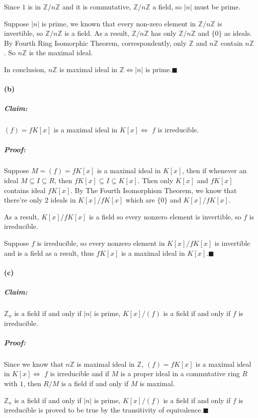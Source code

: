 \documentclass[11pt]{article}
\begin{document}
		Since $1$ is in $\mathbb{Z}/n\mathbb{Z}$ and it is commutative, $\mathbb{Z}/n\mathbb{Z}$ a field, so $|n|$ must be prime.
		
		Suppose $|n|$ is prime, we known that every non-zero element in $\mathbb{Z}/n\mathbb{Z}$ is invertible, so $\mathbb{Z}/n\mathbb{Z}$ is a field. As a result, $\mathbb{Z}/n\mathbb{Z}$ has only $\mathbb{Z}/n\mathbb{Z}$ and $\{0\}$ as ideals. By Fourth Ring Isomorphic Theorem, correspondently, only $\mathbb{Z}$ and $n\mathbb{Z}$ contain $n\mathbb{Z}$. So $n\mathbb{Z}$ is the maximal ideal.
		
		In conclusion, $n\mathbb{Z}$ is maximal ideal in $\mathbb{Z} \Leftrightarrow |n|$ is prime.$\blacksquare$
		
		
	\paragraph{(b)}
		\subparagraph{Claim:} $(f) = fK[x]$ is a maximal ideal in $K[x] \Leftrightarrow$ $f$ is irreducible.
		\subparagraph{Proof:} Suppose $M = (f) = fK[x]$ is a maximal ideal in $K[x]$, then if whenever an ideal $M \subseteq I \subseteq R$, then $fK[x] \subseteq I \subseteq K[x]$. Then only $K[x]$ and $fK[x]$ contains ideal $fK[x]$. By The Fourth Isomorphism Theorem, we know that there're only $2$ ideals in $K[x]/fK[x]$ which are $\{0\}$ and $K[x]/fK[x]$. 
		
	As a result, $K[x]/fK[x]$ is a field	 so every nonzero element is invertible, so $f$ is irreducible.
	
	Suppose $f$ is irreducible, so every nonzero element in $K[x]/fK[x]$ is invertible and is a field as a result, thus $fK[x]$ is a maximal ideal in $K[x]$.$\blacksquare$
	 
	\paragraph{(c)}
		\subparagraph{Claim:} $\mathbb{Z}_n$ is a field if and only if $|n|$ is prime, $K[x]/(f)$ is a field if and only if $f$ is irreducible.
		\subparagraph{Proof:}
			Since we know that $n\mathbb{Z}$ is maximal ideal in $\mathbb{Z}$, $(f) = fK[x]$ is a maximal ideal in $K[x] \Leftrightarrow$ $f$ is irreducible and if $M$ is a proper ideal in a commutative ring $R$ with $1$, then $R/M$ is a field if and only if $M$ is maximal.
			
			$\mathbb{Z}_n$ is a field if and only if $|n|$ is prime, $K[x]/(f)$ is a field if and only if $f$ is irreducible is proved to be true by the transitivity of equivalence.$\blacksquare$
\end{document}
